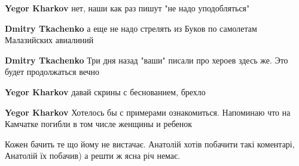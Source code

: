 \begin{itemize}
\begin{itemize}
\textbf{Yegor Kharkov} нет, наши как раз пишут "не надо уподобляться"

 
\textbf{Dmitry Tkachenko} а еще не надо стрелять из Буков по самолетам Малазийских авиалиний

 
\textbf{Dmitry Tkachenko} Три дня назад "ваши" писали про хероев здесь же. Это будет продолжаться вечно

 
\textbf{Yegor Kharkov} давай скрины с беснованием, брехло

 
\textbf{Yegor Kharkov} Хотелось бы с примерами ознакомиться. Напоминаю что на Камчатке погибли в том числе женщины и ребенок
\end{itemize}

 
Кожен бачить те що йому не вистачає. Анатолій хотів побачити такі коментарі,
Анатолій їх побачив) а решти ж ясна річ немає.

\begin{itemize}
 

\end{itemize}
\end{itemize}
